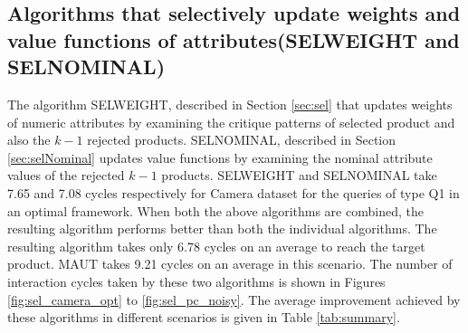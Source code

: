 \subsection{Algorithms that selectively update weights and value functions of attributes(SELWEIGHT and SELNOMINAL)}
The algorithm SELWEIGHT, described in Section \ref{sec:sel} that updates weights of numeric attributes by examining the critique patterns of selected product and also the $k-1$ rejected products.
SELNOMINAL, described in Section \ref{sec:selNominal} updates value functions by examining the nominal attribute values of the rejected $k-1$ products.
SELWEIGHT and SELNOMINAL take 7.65 and 7.08 cycles respectively for Camera dataset for the queries of type Q1 in an optimal framework.
When both the above algorithms are combined, the resulting algorithm performs better than both the individual algorithms.
The resulting algorithm takes only 6.78 cycles on an average to reach the target product.
MAUT takes 9.21 cycles on an average in this scenario.
The number of interaction cycles taken by these two algorithms is shown in Figures \ref{fig:sel_camera_opt} to \ref{fig:sel_pc_noisy}.
The average improvement achieved by these algorithms in different scenarios is given in Table \ref{tab:summary}.

